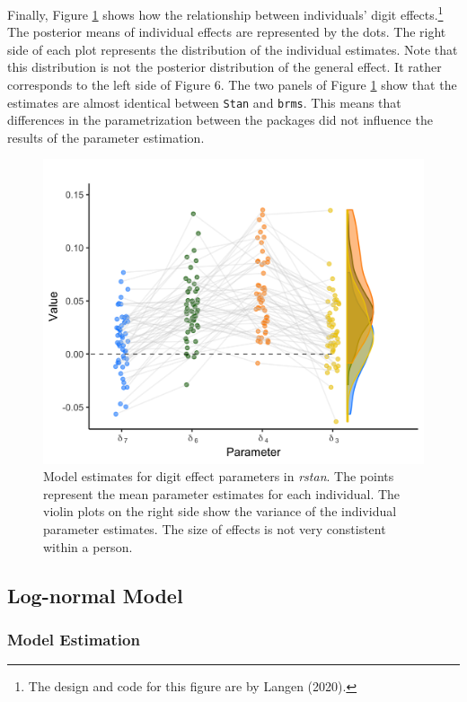 \documentclass[
  english,
  doc,floatsintext]{apa6}
\begin{document}
Finally, Figure \ref{fig:modelestimatesfigure3} shows how the relationship between individuals' digit effects.\footnote{The design and code for this figure are by Langen (2020).} The posterior means of individual effects are represented by the dots. The right side of each plot represents the distribution of the individual estimates. Note that this distribution is not the posterior distribution of the general effect. It rather corresponds to the left side of Figure 6. The two panels of Figure \ref{fig:modelestimatesfigure3} show that the estimates are almost identical between \texttt{Stan} and \texttt{brms}. This means that differences in the parametrization between the packages did not influence the results of the parameter estimation.

\begin{figure}[H]

\includegraphics[width=0.75\linewidth]{Images/Fig11_modelestimatefigure2_onlyrstan_v2} \hfill{}

\caption{Model estimates for digit effect parameters in \textit{rstan}. The points represent the mean parameter estimates for each individual. The violin plots on the right side show the variance of the individual parameter estimates. The size of effects is not very constistent within a person.}\label{fig:modelestimatesfigure3}
\end{figure}

\hypertarget{log-normal-model-2}{%
\subsection{Log-normal Model}\label{log-normal-model-2}}

\hypertarget{model-estimation}{%
\subsubsection{Model Estimation}\label{model-estimation}}
\end{document}

